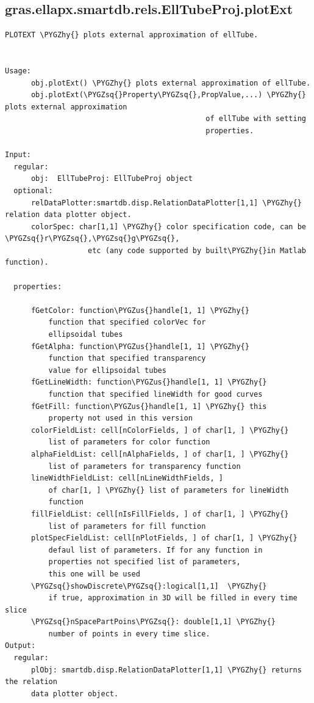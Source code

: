 \documentclass[letterpaper,10pt,english]{sphinxmanual}
\def\PYGZus{\char`\_}
\def\PYGZhy{\char`\-}
\def\PYGZsq{\char`\'}
\begin{document}
\subsection{gras.ellapx.smartdb.rels.EllTubeProj.plotExt}
\label{chap_functions:gras-ellapx-smartdb-rels-elltubeproj-plotext}
\begin{Verbatim}[commandchars=\\\{\}]
PLOTEXT \PYGZhy{} plots external approximation of ellTube.


Usage:
      obj.plotExt() \PYGZhy{} plots external approximation of ellTube.
      obj.plotExt(\PYGZsq{}Property\PYGZsq{},PropValue,...) \PYGZhy{} plots external approximation
                                              of ellTube with setting
                                              properties.

Input:
  regular:
      obj:  EllTubeProj: EllTubeProj object
  optional:
      relDataPlotter:smartdb.disp.RelationDataPlotter[1,1] \PYGZhy{} relation data plotter object.
      colorSpec: char[1,1] \PYGZhy{} color specification code, can be \PYGZsq{}r\PYGZsq{},\PYGZsq{}g\PYGZsq{},
                   etc (any code supported by built\PYGZhy{}in Matlab function).

  properties:

      fGetColor: function\PYGZus{}handle[1, 1] \PYGZhy{}
          function that specified colorVec for
          ellipsoidal tubes
      fGetAlpha: function\PYGZus{}handle[1, 1] \PYGZhy{}
          function that specified transparency
          value for ellipsoidal tubes
      fGetLineWidth: function\PYGZus{}handle[1, 1] \PYGZhy{}
          function that specified lineWidth for good curves
      fGetFill: function\PYGZus{}handle[1, 1] \PYGZhy{} this
          property not used in this version
      colorFieldList: cell[nColorFields, ] of char[1, ] \PYGZhy{}
          list of parameters for color function
      alphaFieldList: cell[nAlphaFields, ] of char[1, ] \PYGZhy{}
          list of parameters for transparency function
      lineWidthFieldList: cell[nLineWidthFields, ]
          of char[1, ] \PYGZhy{} list of parameters for lineWidth
          function
      fillFieldList: cell[nIsFillFields, ] of char[1, ] \PYGZhy{}
          list of parameters for fill function
      plotSpecFieldList: cell[nPlotFields, ] of char[1, ] \PYGZhy{}
          defaul list of parameters. If for any function in
          properties not specified list of parameters,
          this one will be used
      \PYGZsq{}showDiscrete\PYGZsq{}:logical[1,1]  \PYGZhy{}
          if true, approximation in 3D will be filled in every time slice
      \PYGZsq{}nSpacePartPoins\PYGZsq{}: double[1,1] \PYGZhy{}
          number of points in every time slice.
Output:
  regular:
      plObj: smartdb.disp.RelationDataPlotter[1,1] \PYGZhy{} returns the relation
      data plotter object.
\end{Verbatim}
\end{document}
